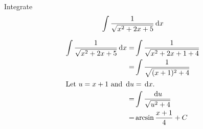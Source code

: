 \begin{ex}
  Integrate
    \[ \int \frac{1}{\sqrt{x^2+2x+5}}\,\mathrm{d} x \]
  \begin{sol}
    \begin{align*}
      \int \frac{1}{\sqrt{x^2+2x+5}}\,\mathrm{d} x
      =& \int \frac{1}{\sqrt{x^2+2x+1+4}} \\
      =& \int \frac{1}{\sqrt{(x+1)^2+4}} \\
      \intertext{Let $u=x+1$ and $\,\mathrm{d} u=\,\mathrm{d} x$.}
      =& \int \frac{\,\mathrm{d} u}{\sqrt{u^2+4}} \\
      =& \arcsin \frac{x+1}{4}+C
    \end{align*}
  \end{sol}
\end{ex}



